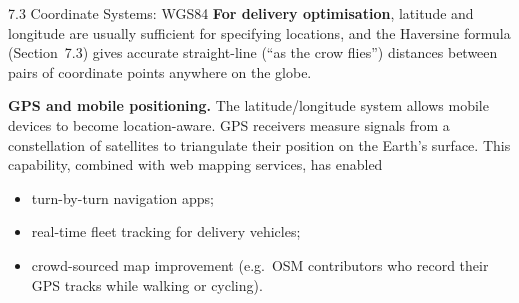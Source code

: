 \documentclass[aspectratio=169,10pt]{beamer}
\begin{document}
\begin{frame}[allowframebreaks]{7.3 Coordinate Systems: WGS84}
  \textbf{For delivery optimisation}, latitude and longitude are
  usually sufficient for specifying locations, and the Haversine
  formula (Section~7.3) gives accurate straight-line (``as the crow
  flies'') distances between pairs of coordinate points anywhere on
  the globe.

  \framebreak

  \textbf{GPS and mobile positioning.}
  The latitude/longitude system allows mobile devices to become
  location-aware.  GPS receivers measure signals from a constellation
  of satellites to triangulate their position on the Earth's surface.
  This capability, combined with web mapping services, has enabled
  \begin{itemize}
    \item turn-by-turn navigation apps;
    \item real-time fleet tracking for delivery vehicles;
    \item crowd-sourced map improvement (e.g.\ OSM contributors who
          record their GPS tracks while walking or cycling).
  \end{itemize}

\end{frame}
\end{document}
